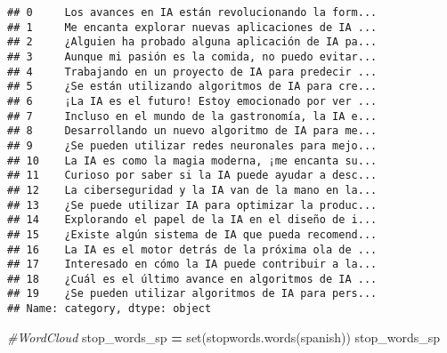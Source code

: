 \documentclass[
]{article}
\newenvironment{Shaded}{\begin{snugshade}}{\end{snugshade}}
\newcommand{\BuiltInTok}[1]{#1}
\newcommand{\CommentTok}[1]{\textcolor[rgb]{0.56,0.35,0.01}{\textit{#1}}}
\newcommand{\NormalTok}[1]{#1}
\newcommand{\OperatorTok}[1]{\textcolor[rgb]{0.81,0.36,0.00}{\textbf{#1}}}
\newcommand{\StringTok}[1]{\textcolor[rgb]{0.31,0.60,0.02}{#1}}
\begin{document}
\begin{verbatim}
## 0     Los avances en IA están revolucionando la form...
## 1     Me encanta explorar nuevas aplicaciones de IA ...
## 2     ¿Alguien ha probado alguna aplicación de IA pa...
## 3     Aunque mi pasión es la comida, no puedo evitar...
## 4     Trabajando en un proyecto de IA para predecir ...
## 5     ¿Se están utilizando algoritmos de IA para cre...
## 6     ¡La IA es el futuro! Estoy emocionado por ver ...
## 7     Incluso en el mundo de la gastronomía, la IA e...
## 8     Desarrollando un nuevo algoritmo de IA para me...
## 9     ¿Se pueden utilizar redes neuronales para mejo...
## 10    La IA es como la magia moderna, ¡me encanta su...
## 11    Curioso por saber si la IA puede ayudar a desc...
## 12    La ciberseguridad y la IA van de la mano en la...
## 13    ¿Se puede utilizar IA para optimizar la produc...
## 14    Explorando el papel de la IA en el diseño de i...
## 15    ¿Existe algún sistema de IA que pueda recomend...
## 16    La IA es el motor detrás de la próxima ola de ...
## 17    Interesado en cómo la IA puede contribuir a la...
## 18    ¿Cuál es el último avance en algoritmos de IA ...
## 19    ¿Se pueden utilizar algoritmos de IA para pers...
## Name: category, dtype: object
\end{verbatim}

\begin{Shaded}
\begin{Highlighting}[]
\CommentTok{\#WordCloud}
\NormalTok{stop\_words\_sp }\OperatorTok{=} \BuiltInTok{set}\NormalTok{(stopwords.words(}\StringTok{\textquotesingle{}spanish\textquotesingle{}}\NormalTok{))}
\NormalTok{stop\_words\_sp}
\end{Highlighting}
\end{Shaded}
\end{document}

